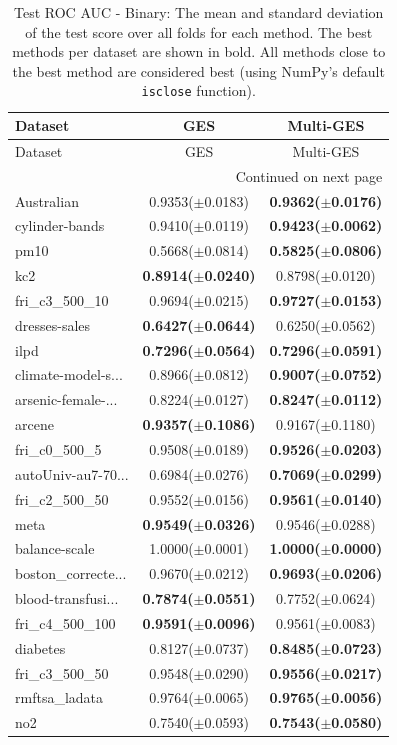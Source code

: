 \begin{longtable}{lcc}
\caption{Test ROC AUC - Binary: The mean and standard deviation of the test score over all folds for each method. The best methods per dataset are shown in bold. All methods close to the best method are considered best (using NumPy’s default \texttt{isclose} function).}
\label{tab:results} \\ 
\toprule
Dataset & GES & Multi-GES \\
\midrule
\endfirsthead
\toprule
Dataset & GES & Multi-GES \\
\midrule
\endhead
\midrule
\multicolumn{3}{r}{Continued on next page} \\
\midrule
\endfoot
\bottomrule
\endlastfoot
Australian & 0.9353($\pm$0.0183) & \textbf{0.9362($\pm$0.0176)} \\
cylinder-bands & 0.9410($\pm$0.0119) & \textbf{0.9423($\pm$0.0062)} \\
pm10 & 0.5668($\pm$0.0814) & \textbf{0.5825($\pm$0.0806)} \\
kc2 & \textbf{0.8914($\pm$0.0240)} & 0.8798($\pm$0.0120) \\
fri\_c3\_500\_10 & 0.9694($\pm$0.0215) & \textbf{0.9727($\pm$0.0153)} \\
dresses-sales & \textbf{0.6427($\pm$0.0644)} & 0.6250($\pm$0.0562) \\
ilpd & \textbf{0.7296($\pm$0.0564)} & \textbf{0.7296($\pm$0.0591)} \\
climate-model-s... & 0.8966($\pm$0.0812) & \textbf{0.9007($\pm$0.0752)} \\
arsenic-female-... & 0.8224($\pm$0.0127) & \textbf{0.8247($\pm$0.0112)} \\
arcene & \textbf{0.9357($\pm$0.1086)} & 0.9167($\pm$0.1180) \\
fri\_c0\_500\_5 & 0.9508($\pm$0.0189) & \textbf{0.9526($\pm$0.0203)} \\
autoUniv-au7-70... & 0.6984($\pm$0.0276) & \textbf{0.7069($\pm$0.0299)} \\
fri\_c2\_500\_50 & 0.9552($\pm$0.0156) & \textbf{0.9561($\pm$0.0140)} \\
meta & \textbf{0.9549($\pm$0.0326)} & 0.9546($\pm$0.0288) \\
balance-scale & 1.0000($\pm$0.0001) & \textbf{1.0000($\pm$0.0000)} \\
boston\_correcte... & 0.9670($\pm$0.0212) & \textbf{0.9693($\pm$0.0206)} \\
blood-transfusi... & \textbf{0.7874($\pm$0.0551)} & 0.7752($\pm$0.0624) \\
fri\_c4\_500\_100 & \textbf{0.9591($\pm$0.0096)} & 0.9561($\pm$0.0083) \\
diabetes & 0.8127($\pm$0.0737) & \textbf{0.8485($\pm$0.0723)} \\
fri\_c3\_500\_50 & 0.9548($\pm$0.0290) & \textbf{0.9556($\pm$0.0217)} \\
rmftsa\_ladata & 0.9764($\pm$0.0065) & \textbf{0.9765($\pm$0.0056)} \\
no2 & 0.7540($\pm$0.0593) & \textbf{0.7543($\pm$0.0580)} \\
\bottomrule
\end{longtable}
